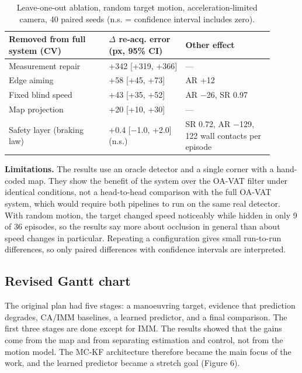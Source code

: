 \documentclass[12pt,a4paper]{article}
\begin{document}
\begin{table}[htbp]
  \centering
  \small
  \caption{Leave-one-out ablation, random target motion, acceleration-limited camera, 40 paired seeds (n.s. = confidence interval includes zero).}
  \renewcommand{\arraystretch}{1.15}
  \begin{tabular}{>{\raggedright\arraybackslash}p{0.34\linewidth}>{\raggedright\arraybackslash}p{0.26\linewidth}>{\raggedright\arraybackslash}p{0.30\linewidth}}
  \toprule
  \textbf{Removed from full system (CV)} & \textbf{$\Delta$ re-acq. error (px, 95\% CI)} & \textbf{Other effect} \\
  \midrule
  Measurement repair & +342 [+319, +366] & — \\
  Edge aiming & +58 [+45, +73] & AR +12 \\
  Fixed blind speed & +43 [+35, +52] & AR $-$26, SR 0.97 \\
  Map projection & +20 [+10, +30] & — \\
  Safety layer (braking law) & +0.4 [$-$1.0, +2.0] (n.s.) & SR 0.72, AR $-$129, 122 wall contacts per episode \\
  \bottomrule
  \end{tabular}
\end{table}

\textbf{Limitations.} The results use an oracle detector and a single corner with a hand-coded map. They show the benefit of the system over the OA-VAT filter under identical conditions, not a head-to-head comparison with the full OA-VAT system, which would require both pipelines to run on the same real detector. With random motion, the target changed speed noticeably while hidden in only 9 of 36 episodes, so the results say more about occlusion in general than about speed changes in particular. Repeating a configuration gives small run-to-run differences, so only paired differences with confidence intervals are interpreted.

\subsection{Revised Gantt chart}
The original plan had five stages: a manoeuvring target, evidence that prediction degrades, CA/IMM baselines, a learned predictor, and a final comparison. The first three stages are done except for IMM. The results showed that the gains come from the map and from separating estimation and control, not from the motion model. The MC-KF architecture therefore became the main focus of the work, and the learned predictor became a stretch goal (Figure 6).
\end{document}
